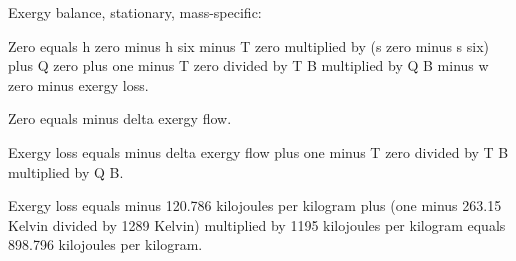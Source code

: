 Exergy balance, stationary, mass-specific:  

Zero equals h zero minus h six minus T zero multiplied by (s zero minus s six) plus Q zero plus one minus T zero divided by T B multiplied by Q B minus w zero minus exergy loss.  

Zero equals minus delta exergy flow.  

Exergy loss equals minus delta exergy flow plus one minus T zero divided by T B multiplied by Q B.  

Exergy loss equals minus 120.786 kilojoules per kilogram plus (one minus 263.15 Kelvin divided by 1289 Kelvin) multiplied by 1195 kilojoules per kilogram equals 898.796 kilojoules per kilogram.